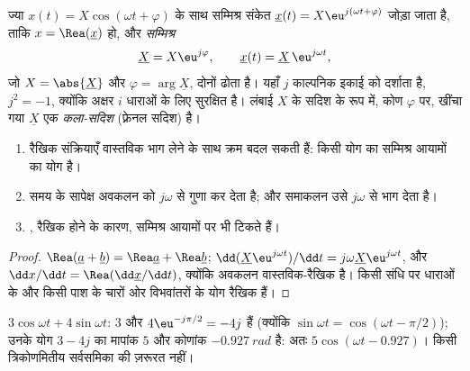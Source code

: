 \begin{definition}[सम्मिश्र आयाम]\label{def:b1:sinusoidal-impedance:complex}
ज्या $x(t) = X\cos(\omega t + \varphi)$ के साथ
सम्मिश्र संकेत $\underline{x}(t) = X\eu^{j(\omega t + \varphi)}$ जोड़ा जाता है, ताकि
$x = \Rea(\underline{x})$ हो, और \emph{सम्मिश्र }
\[
\underline{X} = X\eu^{j\varphi}, \qquad \underline{x}(t) = \underline{X}\,\eu^{j\omega t},
\]
जो  $X = \abs{\underline{X}}$ और 
$\varphi = \arg\underline{X}$, दोनों ढोता है। यहाँ $j$ काल्पनिक इकाई को
दर्शाता है, $j^2 = -1$, क्योंकि अक्षर $i$ धाराओं के लिए सुरक्षित है। लंबाई $X$ के सदिश के रूप में, कोण
$\varphi$ पर, खींचा गया $\underline{X}$ एक
\emph{कला-सदिश} (फ़्रेनल सदिश) है।
\end{definition}

\begin{proposition}[सम्मिश्र विधि के नियम]\label{prop:b1:sinusoidal-impedance:rules}
\begin{enumerate}
  \item रैखिक संक्रियाएँ वास्तविक भाग लेने के साथ क्रम बदल सकती हैं: किसी
        योग का  सम्मिश्र आयामों का योग है।
  \item समय के सापेक्ष अवकलन  को
        $j\omega$ से गुणा कर देता है; और समाकलन उसे $j\omega$ से भाग देता है।
  \item {}, रैखिक होने के कारण, सम्मिश्र आयामों पर भी टिकते हैं।
\end{enumerate}
\end{proposition}

\begin{proof}
$\Rea(\underline a + \underline b) = \Rea\underline a + \Rea\underline b$;
$\dd(\underline X\eu^{j\omega t})/\dd t = j\omega\underline X\eu^{j\omega t}$,
और $\dd x/\dd t = \Rea(\dd\underline x/\dd t)$, क्योंकि अवकलन
वास्तविक-रैखिक है। किसी संधि पर धाराओं के और किसी पाश के चारों ओर विभवांतरों
के योग रैखिक हैं।
\end{proof}

\begin{example}[दो ज्याओं को जोड़ना]\label{ex:b1:sinusoidal-impedance:add}
$3\cos\omega t + 4\sin\omega t$:  $3$ और
$4\eu^{-j\pi/2} = -4j$ हैं (क्योंकि $\sin\omega t = \cos(\omega t - \pi/2)$);
उनके योग $3 - 4j$ का मापांक $5$ और कोणांक $-0.927\ \unit{rad}$ है:
अतः $5\cos(\omega t - 0.927)$। किसी त्रिकोणमितीय सर्वसमिका की ज़रूरत नहीं।
\end{example}

